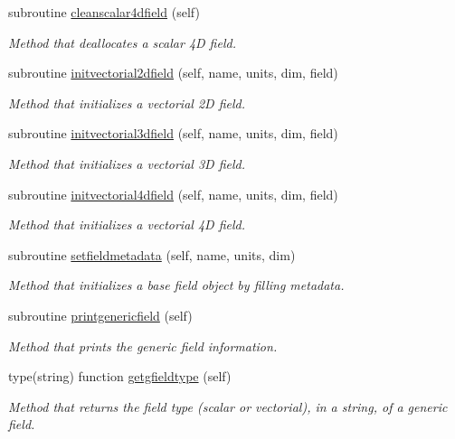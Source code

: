 \begin{DoxyCompactItemize}
subroutine \mbox{\hyperlink{namespacefieldtypes__mod_aaabae216913c347395d5e19ea2c22286}{cleanscalar4dfield}} (self)
\begin{DoxyCompactList}\small\item\em Method that deallocates a scalar 4D field. \end{DoxyCompactList}\item 
subroutine \mbox{\hyperlink{namespacefieldtypes__mod_ac3e3d9aabba3893d61583e890e3bdf41}{initvectorial2dfield}} (self, name, units, dim, field)
\begin{DoxyCompactList}\small\item\em Method that initializes a vectorial 2D field. \end{DoxyCompactList}\item 
subroutine \mbox{\hyperlink{namespacefieldtypes__mod_a20d935cfa1513350667d04f969be5e26}{initvectorial3dfield}} (self, name, units, dim, field)
\begin{DoxyCompactList}\small\item\em Method that initializes a vectorial 3D field. \end{DoxyCompactList}\item 
subroutine \mbox{\hyperlink{namespacefieldtypes__mod_ad458710e4a2d6c40a3dfa7f19481cd5a}{initvectorial4dfield}} (self, name, units, dim, field)
\begin{DoxyCompactList}\small\item\em Method that initializes a vectorial 4D field. \end{DoxyCompactList}\item 
subroutine \mbox{\hyperlink{namespacefieldtypes__mod_abc601ce9f8a974f426e876cc4c02e2a2}{setfieldmetadata}} (self, name, units, dim)
\begin{DoxyCompactList}\small\item\em Method that initializes a base field object by filling metadata. \end{DoxyCompactList}\item 
subroutine \mbox{\hyperlink{namespacefieldtypes__mod_a63d399d72fffde3fe8169b76cce59259}{printgenericfield}} (self)
\begin{DoxyCompactList}\small\item\em Method that prints the generic field information. \end{DoxyCompactList}\item 
type(string) function \mbox{\hyperlink{namespacefieldtypes__mod_abd34452f9afd91c4b9eeb60c51908312}{getgfieldtype}} (self)
\begin{DoxyCompactList}\small\item\em Method that returns the field type (scalar or vectorial), in a string, of a generic field. \end{DoxyCompactList}\item 

\end{DoxyCompactItemize}
